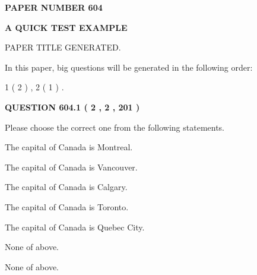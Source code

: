 \documentclass[12pt]{article}
\begin{document}
   
   
   
\newpage 
\setcounter{page}{ 
   604001 } 
   
   
   
   
 {\textbf{ \Large{ PAPER NUMBER  604  }}}
   
   
\vspace{0.2in}
   
   
   
   
   
   
   
   
 \vspace{0.2in}
{\LARGE {\textbf{ A QUICK TEST EXAMPLE}}}
   
   
 PAPER TITLE GENERATED.
   
   
   
\vspace{0.2in}
   
In this paper, big questions will be generated in the following order: 
   
   
   1 ( 2 )
 ,
   2 ( 1 )
 .
  
\vspace{0.2in}
  
{\textbf{\Large{QUESTION
604.1 
 ( 2 , 2 , 201 )
}}}
  
  
Please choose the correct one from the following statements.
 
 
The capital of Canada is Montreal.
 
 
The capital of Canada is Vancouver.
 
 
The capital of Canada is Calgary.
 
 
The capital of Canada is Toronto.
 
 
The capital of Canada is Quebec City.
 
 
 None of above.
 
 
\noindent{}
 
 
 None of above.
 
 
\noindent{}
 
 
   
   
   
\end{document}
